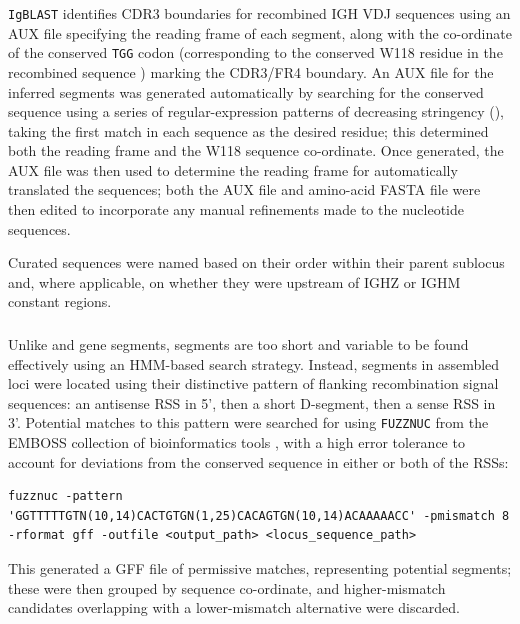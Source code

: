 \lstinline{IgBLAST} \parencite{ye2013igblast} identifies CDR3 boundaries for recombined IGH VDJ sequences using an AUX file specifying the reading frame of each \jh segment, along with the co-ordinate of the conserved \texttt{TGG} codon (corresponding to the conserved W118 residue in the recombined sequence \parencite{lefranc2014immunoglobulins}) marking the CDR3/FR4 boundary. An AUX file for the inferred \jh segments was generated automatically by searching for the conserved sequence using a series of regular-expression patterns of decreasing stringency (), taking the first match in each sequence as the desired residue; this determined both the reading frame and the W118 sequence co-ordinate. Once generated, the AUX file was then used to determine the reading frame for automatically translated the \jh sequences; both the AUX file and amino-acid FASTA file were then edited to incorporate any manual refinements made to the \jh nucleotide sequences.

Curated \jh sequences were named based on their order within their parent sublocus and, where applicable, on whether they were upstream of IGHZ or IGHM constant regions. 

\subsubsection{\dh}

Unlike \vh and \jh gene segments, \dh segments are too short and variable to be found effectively using an HMM-based search strategy. Instead, \dh segments in assembled loci were located using their distinctive pattern of flanking recombination signal sequences: an antisense RSS in 5', then a short D-segment, then a sense RSS in 3'. Potential matches to this pattern were searched for using \lstinline{FUZZNUC} from the EMBOSS collection of bioinformatics tools \parencite{rice2000emboss}, with a high error tolerance to account for deviations from the conserved sequence in either or both of the RSSs:

\begin{lstlisting}
fuzznuc -pattern 'GGTTTTTGTN(10,14)CACTGTGN(1,25)CACAGTGN(10,14)ACAAAAACC' -pmismatch 8 -rformat gff -outfile <output_path> <locus_sequence_path>
\end{lstlisting}

This generated a GFF file \parencite{stein2010generic} of permissive matches, representing potential \dh segments; these were then grouped by sequence co-ordinate, and higher-mismatch candidates overlapping with a lower-mismatch alternative were discarded.

